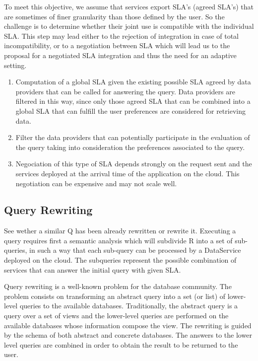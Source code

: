 To meet this objective, we assume that services export SLA's (agreed SLA's) that are sometimes of finer granularity than those defined by the user. So the challenge  is  to determine whether their joint use is compatible with the individual SLA. This step may lead either to the rejection of integration in case of total incompatibility, or to a negotiation between SLA which will lead us to the proposal for a negotiated SLA integration and thus the need for an adaptive setting.


 \begin{enumerate}
\item Computation of a global SLA given the existing possible SLA agreed by data providers that can be called for answering the query. Data providers are filtered in this way, since only those agreed SLA that can be combined into a global SLA that can fulfill the user preferences are considered for retrieving data.

  
  \item Filter the data providers that can potentially participate in the evaluation of the query taking into consideration the preferences associated to the query.
  
  \item Negociation of this type of SLA depends strongly on the request sent and the services deployed at the arrival time of the application on the cloud. This negotiation can be expensive and may not scale well.
  \end{enumerate}


\subsection{Query Rewriting}
\label{sec:queryRew}
{\color{red}
See wether a similar Q has been already rewritten or rewrite it. Executing a query requires first a semantic analysis which will subdivide R into a set of sub-queries, in such a way that each sub-query can be processed by a DataService deployed on the cloud.   The subqueries represent the possible combination of services that can answer the initial query with given SLA.
}

Query rewriting is a well-known problem for the database community.
The problem consists on transforming an abstract query into a set (or list) of lower-level queries to the available databases.
Traditionally, the abstract query is a query over a set of views and the lower-level queries are performed on the available databases whose information compose the view. 
The rewriting is guided by the schema of both abstract and concrete databases.
The answers to the lower level queries are combined in order to obtain the result to be returned to the user.

